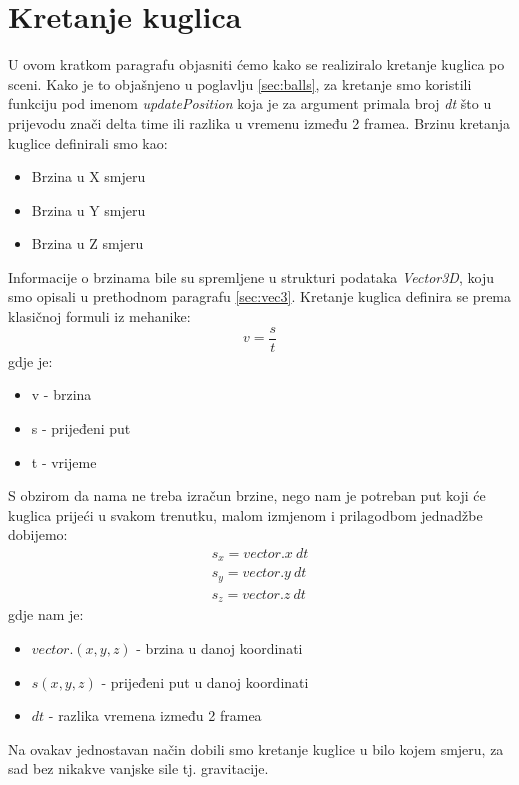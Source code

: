 \section{Kretanje kuglica}
U ovom kratkom paragrafu objasniti ćemo kako se realiziralo kretanje kuglica po sceni. Kako je to objašnjeno u poglavlju \ref{sec:balls}, za kretanje smo koristili funkciju pod imenom \emph{updatePosition} koja je za argument primala broj \emph{dt} što u prijevodu znači delta time ili razlika u vremenu između 2 framea. 
Brzinu kretanja kuglice definirali smo kao:
\begin{itemize}
	\item Brzina u X smjeru
	\item Brzina u Y smjeru
	\item Brzina u Z smjeru
\end{itemize}
Informacije o brzinama bile su spremljene u strukturi podataka \emph{Vector3D}, koju smo opisali u prethodnom paragrafu \ref{sec:vec3}. Kretanje kuglica definira se prema klasičnoj formuli iz mehanike:
\begin{equation}
		v = \frac{s}{t} \label{equ:brzina}
\end{equation}
gdje je:
\begin{itemize}
	\item v - brzina
	\item s - prijeđeni put
	\item t - vrijeme 
\end{itemize}
S obzirom da nama ne treba izračun brzine, nego nam je potreban put koji će kuglica prijeći u svakom trenutku, malom izmjenom i prilagodbom jednadžbe dobijemo:
\begin{equation}\label{equ:put}
\begin{aligned}
	s_x = vector.x \ dt\\
	s_y = vector.y \ dt\\
	s_z = vector.z \ dt
	\end{aligned}
\end{equation}
gdje nam je:
\begin{itemize}
	\item $vector.(x,y,z)$ - brzina u danoj koordinati
	\item $s (x,y,z)$ - prijeđeni put u danoj koordinati
	\item $dt$ - razlika vremena između 2 framea
\end{itemize}
Na ovakav jednostavan način dobili smo kretanje kuglice u bilo kojem smjeru, za sad bez nikakve vanjske sile tj. gravitacije.
